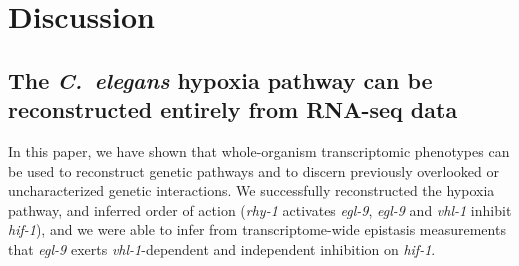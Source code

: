 \documentclass[10pt, onecolumn]{article}
\newcommand{\cel}{\emph{C.~elegans}}
\newcommand{\gene}[1]{\emph{#1}}
\newcommand{\egl}{\emph{\mbox{egl-9}(lf)}}
\newcommand{\rhy}{\emph{\mbox{rhy-1}(lf)}}
\newcommand{\vhl}{\emph{\mbox{vhl-1}(lf)}}
\newcommand{\hif}{\emph{\mbox{hif-1(lf)}}}
\newcommand{\hifp}{HIF-1}
\begin{document}
%
%

\section*{Discussion}
\label{sec:discussion}
\subsection*{The \cel{} hypoxia pathway can be reconstructed entirely from
             RNA-seq data}
In this paper, we have shown that whole-organism transcriptomic phenotypes
can be used to reconstruct genetic pathways and to discern previously overlooked
or uncharacterized genetic interactions. We successfully reconstructed the hypoxia
pathway, and inferred order of action (\gene{rhy-1} activates \gene{egl-9},
\gene{egl-9} and \gene{vhl-1} inhibit \gene{hif-1}), and we were able to infer
from transcriptome-wide epistasis measurements that \gene{egl-9} exerts
\gene{vhl-1}-dependent and independent inhibition on \gene{hif-1}.
\end{document}
